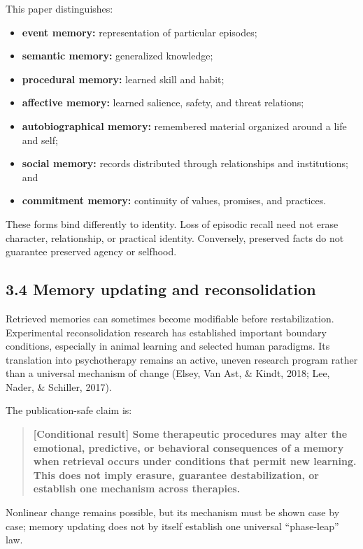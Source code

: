 \documentclass[
  11pt,
]{article}
\providecommand{\tightlist}{%
  \setlength{\itemsep}{0pt}\setlength{\parskip}{0pt}}
\begin{document}
This paper distinguishes:

\begin{itemize}
\tightlist
\item
  \textbf{event memory:} representation of particular episodes;
\item
  \textbf{semantic memory:} generalized knowledge;
\item
  \textbf{procedural memory:} learned skill and habit;
\item
  \textbf{affective memory:} learned salience, safety, and threat
  relations;
\item
  \textbf{autobiographical memory:} remembered material organized around
  a life and self;
\item
  \textbf{social memory:} records distributed through relationships and
  institutions; and
\item
  \textbf{commitment memory:} continuity of values, promises, and
  practices.
\end{itemize}

These forms bind differently to identity. Loss of episodic recall need
not erase character, relationship, or practical identity. Conversely,
preserved facts do not guarantee preserved agency or selfhood.

\subsection{3.4 Memory updating and
reconsolidation}\label{memory-updating-and-reconsolidation}

Retrieved memories can sometimes become modifiable before
restabilization. Experimental reconsolidation research has established
important boundary conditions, especially in animal learning and
selected human paradigms. Its translation into psychotherapy remains an
active, uneven research program rather than a universal mechanism of
change (Elsey, Van Ast, \& Kindt, 2018; Lee, Nader, \& Schiller, 2017).

The publication-safe claim is:

\begin{quote}
\textbf{{[}Conditional result{]} Some therapeutic procedures may alter
the emotional, predictive, or behavioral consequences of a memory when
retrieval occurs under conditions that permit new learning. This does
not imply erasure, guarantee destabilization, or establish one mechanism
across therapies.}
\end{quote}

Nonlinear change remains possible, but its mechanism must be shown case
by case; memory updating does not by itself establish one universal
``phase-leap'' law.
\end{document}
